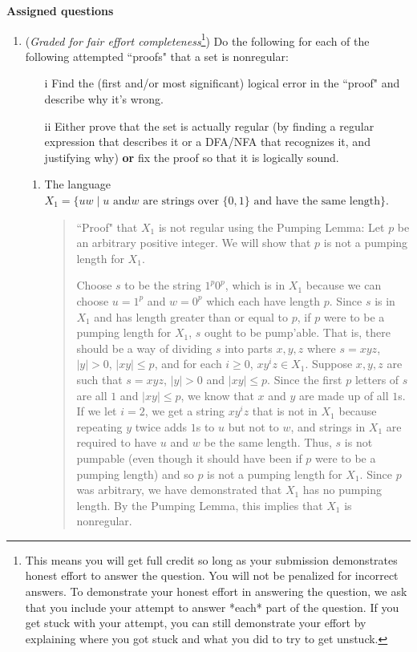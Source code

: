 \newpage
{\bf Assigned questions}
\begin{enumerate}
\item ({\it Graded for fair effort completeness}\footnote{This means 
you will get full credit so long as your submission demonstrates honest 
effort to answer the question. You will not be penalized for incorrect answers. 
To demonstrate your honest effort in answering the question, we ask that you 
include your attempt to answer *each* part of the question. If you get stuck 
with your attempt, you can still demonstrate your effort by explaining where 
you got stuck and what you did to try to get unstuck.})
Do the following for each of the following attempted ``proofs" that  a set is nonregular:
\begin{itemize}
\item[i] Find the (first and/or most significant) logical error in the ``proof" and describe why it's wrong.
\item[ii] Either prove that the set is actually regular (by finding a regular expression that describes it or 
a DFA/NFA that recognizes it, and justifying why) {\bf or} fix the proof so that it is logically sound.
\end{itemize}

\begin{enumerate}
\item The language $X_1 = \{ uw \mid \text{$u$ and
$w$ are strings over $\{0,1\}$ and have the same length} \}$.

\begin{quote}
``Proof" that $X_1$ is not regular using the Pumping Lemma: Let $p$ be 
an arbitrary positive integer. We will show that $p$ is not a pumping length for $X_1$. 

Choose $s$ to be the string $1^p 0^p$, which is in $X_1$ because
we can choose $u = 1^p$ and $w = 0^p$ which each have length $p$.
Since $s$ is in $X_1$ and has length greater than or equal to $p$, if $p$ were to be a
pumping length for $X_1$, $s$ ought to be pump'able. 
That is, there should be a way of dividing $s$ into parts $x,y,z$ where $s=xyz$,
$|y| >0$, $|xy| \leq p$, and for each $i \geq 0$, $xy^iz \in X_1$.
Suppose $x,y,z$ are such that $s = xyz$, $|y| > 0$ and $|xy| \leq p$.
Since the first $p$ letters of $s$ are all $1$ and $|xy| \leq p$, we know
that $x$ and $y$ are made up of all $1$s.  If we let $i=2$, we get 
a string $xy^iz$ that is not in $X_1$ because repeating $y$ twice adds $1$s to 
$u$ but not to $w$, and strings in $X_1$ are required to have $u$ and $w$ be the same
length. Thus, $s$ is not pumpable (even though it should have been if $p$ were to be a pumping length)
and so $p$ is not a pumping length for $X_1$.  Since $p$ was arbitrary, we have
demonstrated that $X_1$ has no pumping length.  By the Pumping Lemma, this implies that 
$X_1$ is nonregular.
\end{quote}



\end{enumerate}
\end{enumerate}
